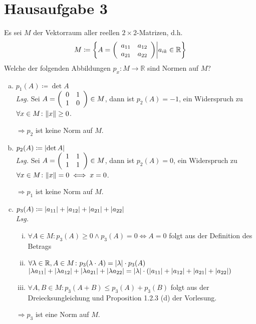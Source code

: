 \documentclass{scrreprt}
\begin{document}
\newpage
\section*{Hausaufgabe 3}

Es sei $M$ der Vektorraum aller reellen $2 \times 2$-Matrizen, d.h.
\[
  M \coloneqq \qty{A = \qty(\begin{array}{cc} a_{11} & a_{12} \\ a_{21} & a_{22}\end{array}) \middle| a_{ik} \in \mathbb{R}}
\]
Welche der folgenden Abbildungen $p_x \colon M \to \mathbb{R}$ sind Normen auf $M$?
\begin{enumerate}[a)]
\item $p_1(A) \coloneqq \det A$ \\

  \textit{Lsg.} Sei $A = \qty(\begin{array}{cc}0&1\\1&0\end{array}) \in M$,
  dann ist $p_2(A) = -1$, ein Widerspruch zu
  $\forall x \in M \colon \norm{x} \geq 0$.

  $\Rightarrow p_2$ ist keine Norm auf $M$.

\item $p_2(A) \coloneqq \abs{\det A}$ \\

  \textit{Lsg.} Sei $A = \qty(\begin{array}{cc}1&1\\1&1\end{array}) \in M$,
  dann ist $p_2(A) = 0$, ein Widerspruch zu
  $\forall x \in M \colon \norm{x} = 0 \iff x = 0$.

  $\Rightarrow p_1$ ist keine Norm auf $M$.

\item $p_3(A) \coloneqq \abs{a_{11}} + \abs{a_{12}} + \abs{a_{21}} + \abs{a_{22}}$ \\

  \textit{Lsg.}
  \begin{enumerate}[(i)]
  \item $\forall A \in M \colon p_3(A) \geq 0 \land p_3(A) = 0 \iff A = 0$ folgt aus der Definition des Betrags
  \item $\forall \lambda \in \mathbb{R}, A \in M \colon p_3(\lambda \cdot A) = \abs{\lambda} \cdot p_3(A)$ \\
    $\abs{\lambda a_{11}} + \abs{\lambda a_{12}} + \abs{\lambda a_{21}} + \abs{\lambda a_{22}} =
    \abs{\lambda} \cdot \qty(\abs{a_{11}} + \abs{a_{12}} + \abs{a_{21}} + \abs{a_{22}})$
  \item $\forall A, B \in M \colon p_3(A + B) \leq p_3(A) + p_3(B)$
    folgt aus der Dreiecksungleichung und Proposition 1.2.3 (d) der Vorlesung.
  \end{enumerate}
  $\Rightarrow p_3$ ist eine Norm auf $M$.


\end{enumerate}
\end{document}
